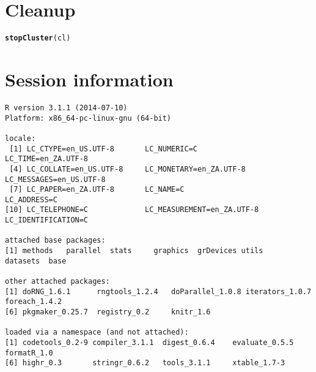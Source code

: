 \documentclass[a4paper,12pt]{article}\usepackage[]{graphicx}\usepackage[]{color}
\makeatletter
\newcommand{\hlstd}[1]{\textcolor[rgb]{0.345,0.345,0.345}{#1}}%
\newcommand{\hlkwd}[1]{\textcolor[rgb]{0.737,0.353,0.396}{\textbf{#1}}}%
\newenvironment{kframe}{%
 \def\at@end@of@kframe{}%
 \ifinner\ifhmode%
  \def\at@end@of@kframe{\end{minipage}}%
  \begin{minipage}{\columnwidth}%
 \fi\fi%
 \def\FrameCommand##1{\hskip\@totalleftmargin \hskip-\fboxsep
 \colorbox{shadecolor}{##1}\hskip-\fboxsep
     \hskip-\linewidth \hskip-\@totalleftmargin \hskip\columnwidth}%
 \MakeFramed {\advance\hsize-\width
   \@totalleftmargin\z@ \linewidth\hsize
   \@setminipage}}%
 {\par\unskip\endMakeFramed%
 \at@end@of@kframe}
\newenvironment{knitrout}{}{} %
\makeatother
\begin{document}
\section*{Cleanup}
\begin{knitrout}\footnotesize
{}\color{fgcolor}\begin{kframe}
\begin{alltt}
\hlkwd{stopCluster}\hlstd{(cl)}
\end{alltt}
\end{kframe}
\end{knitrout}

\section*{Session information}
\begin{knitrout}\footnotesize
{}\color{fgcolor}\begin{kframe}
\begin{verbatim}
R version 3.1.1 (2014-07-10)
Platform: x86_64-pc-linux-gnu (64-bit)

locale:
 [1] LC_CTYPE=en_US.UTF-8       LC_NUMERIC=C               LC_TIME=en_ZA.UTF-8       
 [4] LC_COLLATE=en_US.UTF-8     LC_MONETARY=en_ZA.UTF-8    LC_MESSAGES=en_US.UTF-8   
 [7] LC_PAPER=en_ZA.UTF-8       LC_NAME=C                  LC_ADDRESS=C              
[10] LC_TELEPHONE=C             LC_MEASUREMENT=en_ZA.UTF-8 LC_IDENTIFICATION=C       

attached base packages:
[1] methods   parallel  stats     graphics  grDevices utils     datasets  base     

other attached packages:
[1] doRNG_1.6.1      rngtools_1.2.4   doParallel_1.0.8 iterators_1.0.7  foreach_1.4.2   
[6] pkgmaker_0.25.7  registry_0.2     knitr_1.6       

loaded via a namespace (and not attached):
[1] codetools_0.2-9 compiler_3.1.1  digest_0.6.4    evaluate_0.5.5  formatR_1.0    
[6] highr_0.3       stringr_0.6.2   tools_3.1.1     xtable_1.7-3   
\end{verbatim}
\end{kframe}
\end{knitrout}

\printbibliography[heading=bibintoc]
\end{document}
